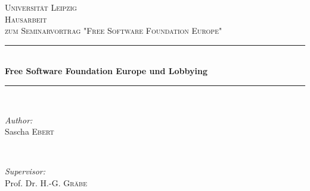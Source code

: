 \begin{titlepage}

\newcommand{\HRule}{\rule{\linewidth}{0.5mm}} %

\center %


\textsc{\LARGE Universität Leipzig}\\[1.5cm] %
\textsc{\Large Hausarbeit}\\[0.5cm] %
\textsc{\large zum Seminarvortrag "Free Software Foundation Europe"}\\[0.5cm] %


\HRule \\[0.4cm]
{ \huge \bfseries Free Software Foundation Europe und Lobbying}\\[0.4cm] %
\HRule \\[1.5cm]


\begin{minipage}{0.4\textwidth}
\begin{flushleft} \large
\emph{Author:}\\
Sascha \textsc{Ebert} %
\end{flushleft}
\end{minipage}
~
\begin{minipage}{0.4\textwidth}
\begin{flushright} \large
\emph{Supervisor:} \\
Prof. Dr. H.-G. \textsc{Gräbe} %
\end{flushright}
\end{minipage}\\[4cm]



\end{titlepage}
